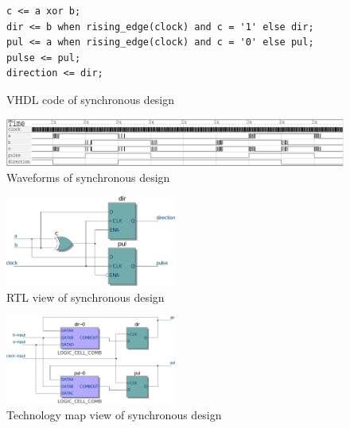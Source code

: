 \documentclass[a4paper]{article}
\begin{document}
\begin{figure}
\centering
\begin{BVerbatim}
c <= a xor b;
dir <= b when rising_edge(clock) and c = '1' else dir;
pul <= a when rising_edge(clock) and c = '0' else pul;
pulse <= pul;
direction <= dir;
\end{BVerbatim}
\caption{VHDL code of synchronous design}
\end{figure}
\begin{figure}
\centering
\includegraphics[width=\textwidth]{quadrature_decoder_gtkwave.pdf}
\caption{Waveforms of synchronous design}
\end{figure}
\begin{figure}
\centering
\includegraphics[width=0.5\textwidth]{quadrature_decoder_quartus_rtl.pdf}
\caption{RTL view of synchronous design}
\end{figure}
\begin{figure}
\centering
\includegraphics[width=0.5\textwidth]{quadrature_decoder_quartus_map.pdf}
\caption{Technology map view of synchronous design}
\end{figure}
\end{document}
